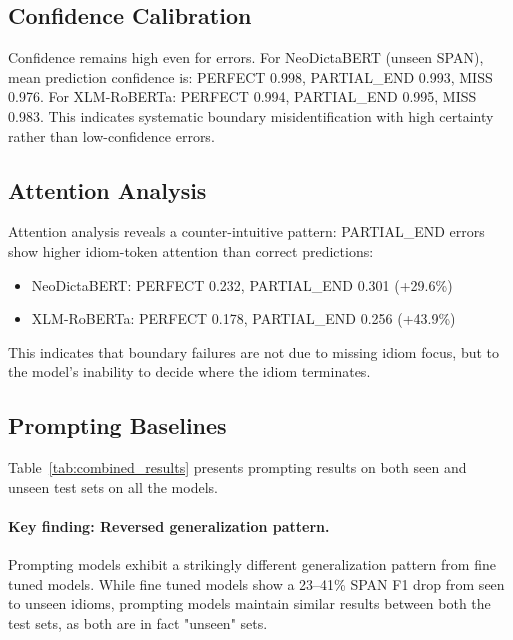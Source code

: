 \documentclass[11pt]{article}
\begin{document}
\subsection{Confidence Calibration}

Confidence remains high even for errors. For NeoDictaBERT (unseen SPAN), mean prediction confidence is: PERFECT 0.998, PARTIAL\_END 0.993, MISS 0.976. For XLM-RoBERTa: PERFECT 0.994, PARTIAL\_END 0.995, MISS 0.983. This indicates systematic boundary misidentification with high certainty rather than low-confidence errors.

\subsection{Attention Analysis}

Attention analysis reveals a counter-intuitive pattern: PARTIAL\_END errors show higher idiom-token attention than correct predictions:
\begin{itemize}
    \item NeoDictaBERT: PERFECT 0.232, PARTIAL\_END 0.301 (+29.6\%)
    \item XLM-RoBERTa: PERFECT 0.178, PARTIAL\_END 0.256 (+43.9\%)
\end{itemize}
This indicates that boundary failures are not due to missing idiom focus, but to the model's inability to decide where the idiom terminates.

\subsection{Prompting Baselines}
\label{sec:prompting}

Table~\ref{tab:combined_results} presents prompting results on both seen and unseen test sets on all the models.


\paragraph{Key finding: Reversed generalization pattern.}
Prompting models exhibit a strikingly different generalization pattern from fine tuned models. While fine tuned models show a 23--41\% SPAN F1 drop from seen to unseen idioms, prompting models maintain similar results between both the test sets, as both are in fact "unseen" sets.
\end{document}
